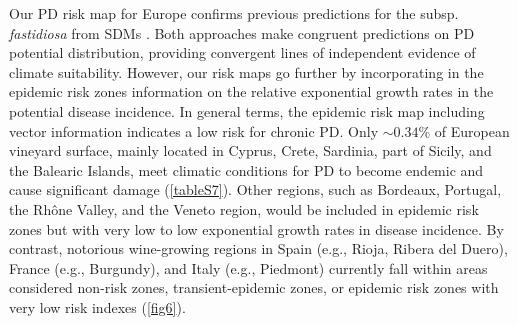     Our PD risk map for Europe confirms previous predictions for the subsp.
    \textit{fastidiosa} from SDMs \cite{Bragard2019}. Both approaches make
    congruent predictions on PD potential distribution, providing convergent
    lines of independent evidence of climate suitability. However, our risk
    maps go further by incorporating in the epidemic risk zones information on
    the relative exponential growth rates in the potential disease incidence.
    In general terms, the epidemic risk map including vector information
    indicates a low risk for chronic PD. Only $\sim 0.34\%$ of European
    vineyard surface, mainly located in Cyprus, Crete, Sardinia, part of
    Sicily, and the Balearic Islands, meet climatic conditions for PD to become
    endemic and cause significant damage (\cref{tableS7}). Other regions, such
    as Bordeaux, Portugal, the Rh\^one Valley, and the Veneto region, would be
    included in epidemic risk zones but with very low to low exponential growth
    rates in disease incidence. By contrast, notorious wine-growing regions in
    Spain (e.g., Rioja, Ribera del Duero), France (e.g., Burgundy), and Italy
    (e.g., Piedmont) currently fall within areas considered non-risk zones,
    transient-epidemic zones, or epidemic risk zones with very low risk indexes
    (\cref{fig6}).

